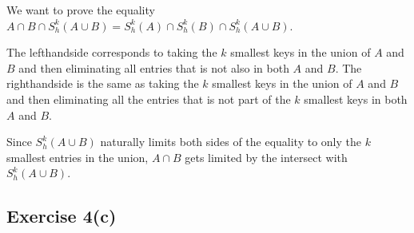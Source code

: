 
We want to prove the equality $A \cap B \cap S^{k}_{h}(A \cup B) = S^{k}_{h}(A)
\cap S^{k}_{h}(B) \cap S^{k}_{h}(A \cup B)$.

The lefthandside corresponds to taking the $k$ smallest keys in the union of
$A$ and $B$ and then eliminating all entries that is not also in both $A$ and
$B$.
%
The righthandside is the same as taking the $k$ smallest keys in the union of
$A$ and $B$ and then eliminating all the entries that is not part of the $k$
smallest keys in both $A$ and $B$.

Since $S^{k}_{h}(A \cup B)$ naturally limits both sides of the equality to only
the $k$ smallest entries in the union, $A \cap B$ gets limited by the intersect
with $S^{k}_{h}(A \cup B)$.


\subsection{Exercise 4(c)}